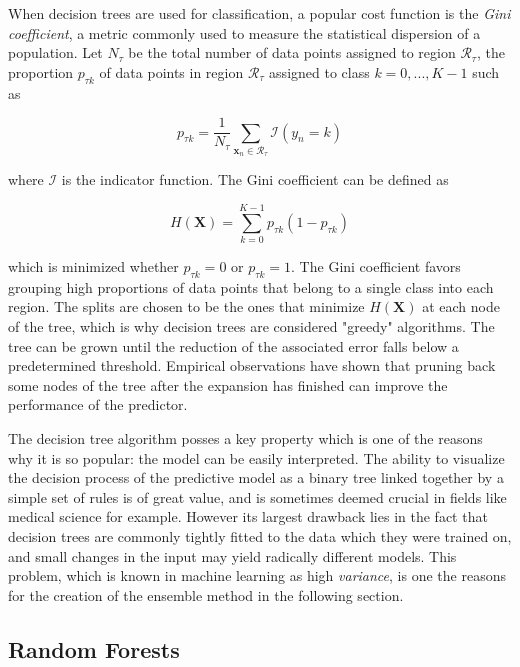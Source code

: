 \documentclass{kththesis}
\begin{document}
When decision trees are used for classification, a popular cost function is the \emph{Gini coefficient}, a metric commonly used to measure the statistical dispersion of a population. Let $N_\tau$ be the total number of data points assigned to region $\mathcal{R}_\tau$,  the proportion $p_{\tau k}$ of data points in region $\mathcal{R}_\tau$ assigned to class $k = 0,...,K-1$ such as 

\begin{equation}
p_{\tau k} = \frac{1}{N_\tau} \sum_{\mathbf{x}_n \in \mathcal{R}_\tau} \mathcal{I}(y_n = k)
\end{equation}
 
 where $\mathcal{I}$ is the indicator function. The Gini coefficient can be defined as 
 
 \begin{equation}
 H(\mathbf{X}) = \sum_{k=0}^{K-1} p_{\tau k} (1-p_{\tau k})
 \end{equation}
 
which is minimized whether $p_{\tau k}=0$ or $p_{\tau k}=1$. The Gini coefficient favors grouping high proportions of data points that belong to a single class into each region. The splits are chosen to be the ones that minimize $H(\mathbf{X})$ at each node of the tree, which is why decision trees are considered "greedy" algorithms. The tree can be grown until the reduction of the associated error falls below a predetermined threshold. Empirical observations have shown that pruning back some nodes of the tree after the expansion has finished can improve the performance of the predictor.
 
The decision tree algorithm posses a key property which is one of the reasons why it is so popular: the model can be easily interpreted. The ability to visualize the decision process of the predictive model as a binary tree linked together by a simple set of rules is of great value, and is sometimes deemed crucial in fields like medical science for example. However its largest drawback lies in the fact that decision trees are commonly tightly fitted to the data which they were trained on, and small changes in the input may yield radically different models. This problem, which is known in machine learning as high \emph{variance}, is one the reasons for the creation of the ensemble method in the following section.
 
\subsection{Random Forests}
\end{document}
